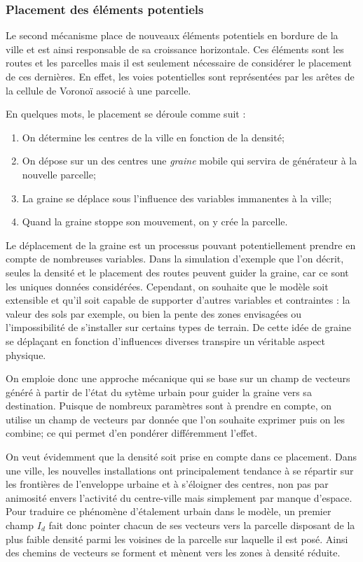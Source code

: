 \documentclass[10pt]{article}
\begin{document}
\subsubsection{Placement des éléments potentiels}

Le second mécanisme place de nouveaux éléments potentiels en bordure
de la ville et est ainsi responsable de sa croissance horizontale. Ces
éléments sont les routes et les parcelles mais il est seulement
nécessaire de considérer le placement de ces dernières. En effet, les
voies potentielles sont représentées par les arêtes de la cellule de
Voronoï associé à une parcelle.

En quelques mots, le placement se déroule comme suit :

\begin{enumerate}
\item{On détermine les centres de la ville en fonction de la densité;}
\item{On dépose sur un des centres une \textit{graine} mobile qui
  servira de générateur à la nouvelle parcelle;}
\item{La graine se déplace sous l'influence des variables immanentes à
  la ville;}
\item{Quand la graine stoppe son mouvement, on y crée la parcelle.}
\end{enumerate}

Le déplacement de la graine est un processus pouvant potentiellement
prendre en compte de nombreuses variables. Dans la simulation
d'exemple que l'on décrit, seules la densité et le placement des
routes peuvent guider la graine, car ce sont les uniques données
considérées. Cependant, on souhaite que le modèle soit extensible et
qu'il soit capable de supporter d'autres variables et contraintes : la
valeur des sols par exemple, ou bien la pente des zones envisagées ou
l'impossibilité de s'installer sur certains types de terrain. De cette
idée de graine se déplaçant en fonction d'influences diverses
transpire un véritable aspect physique.

On emploie donc une approche mécanique qui se base sur un champ de
vecteurs généré à partir de l'état du sytème urbain pour guider la
graine vers sa destination. Puisque de nombreux paramètres sont à
prendre en compte, on utilise un champ de vecteurs par donnée que l'on
souhaite exprimer puis on les combine; ce qui permet d'en pondérer
différemment l'effet.

On veut évidemment que la densité soit prise en compte dans ce
placement. Dans une ville, les nouvelles installations ont
principalement tendance à se répartir sur les frontières de
l'enveloppe urbaine et à s'éloigner des centres, non pas par animosité
envers l'activité du centre-ville mais simplement par manque
d'espace. Pour traduire ce phénomène d'étalement urbain dans le
modèle, un premier champ $I_d$ fait donc pointer chacun de ses
vecteurs vers la parcelle disposant de la plus faible densité parmi
les voisines de la parcelle sur laquelle il est posé. Ainsi des
chemins de vecteurs se forment et mènent vers les zones à densité
réduite.
\end{document}
